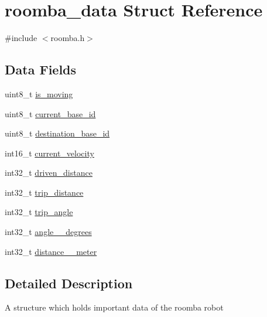 \hypertarget{structroomba__data}{\section{roomba\-\_\-data \-Struct \-Reference}
\label{structroomba__data}
}


{\ttfamily \#include $<$roomba.\-h$>$}

\subsection*{\-Data \-Fields}
\begin{DoxyCompactItemize}
\item 
uint8\-\_\-t \hyperlink{structroomba__data_a27949ed7575f6665baf658b206ba9cff}{is\-\_\-moving}
\item 
uint8\-\_\-t \hyperlink{structroomba__data_a29ec4a96bc0931db96257857fd300de5}{current\-\_\-base\-\_\-id}
\item 
uint8\-\_\-t \hyperlink{structroomba__data_acda989cdf9bced3a9a1598c2328b266b}{destination\-\_\-base\-\_\-id}
\item 
int16\-\_\-t \hyperlink{structroomba__data_a7f174749fed904af98a79cb40f2e9b2c}{current\-\_\-velocity}
\item 
int32\-\_\-t \hyperlink{structroomba__data_a9874cc3ce685901b1a022c32751fff3e}{driven\-\_\-distance}
\item 
int32\-\_\-t \hyperlink{structroomba__data_a22f88fbf731f115d1c35906dd65a9293}{trip\-\_\-distance}
\item 
int32\-\_\-t \hyperlink{structroomba__data_aaa13920a13096418bc196e4b464df213}{trip\-\_\-angle}
\item 
int32\-\_\-t \hyperlink{structroomba__data_a938f80c21b9bcc3a8598135c5b141b75}{angle\-\_\-\_\-degrees}
\item 
int32\-\_\-t \hyperlink{structroomba__data_aa2702f293fb9d49b8c1d60303ca5ba63}{distance\-\_\-\_\-meter}
\end{DoxyCompactItemize}


\subsection{\-Detailed \-Description}
\-A structure which holds important data of the roomba robot 

